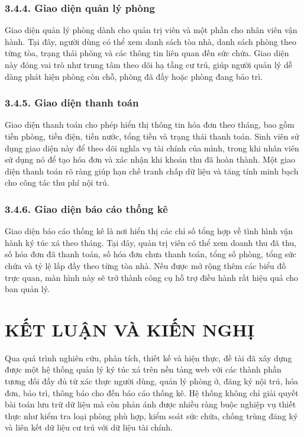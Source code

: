 \documentclass[12pt]{article}
\begin{document}
\subsubsection*{3.4.4. Giao diện quản lý phòng}

Giao diện quản lý phòng dành cho quản trị viên và một phần cho nhân viên vận hành. Tại đây, người dùng có thể xem danh sách tòa nhà, danh sách phòng theo từng tòa, trạng thái phòng và các thông tin liên quan đến sức chứa. Giao diện này đóng vai trò như trung tâm theo dõi hạ tầng cư trú, giúp người quản lý dễ dàng phát hiện phòng còn chỗ, phòng đã đầy hoặc phòng đang bảo trì.

\subsubsection*{3.4.5. Giao diện thanh toán}

Giao diện thanh toán cho phép hiển thị thông tin hóa đơn theo tháng, bao gồm tiền phòng, tiền điện, tiền nước, tổng tiền và trạng thái thanh toán. Sinh viên sử dụng giao diện này để theo dõi nghĩa vụ tài chính của mình, trong khi nhân viên sử dụng nó để tạo hóa đơn và xác nhận khi khoản thu đã hoàn thành. Một giao diện thanh toán rõ ràng giúp hạn chế tranh chấp dữ liệu và tăng tính minh bạch cho công tác thu phí nội trú.

\subsubsection*{3.4.6. Giao diện báo cáo thống kê}

Giao diện báo cáo thống kê là nơi hiển thị các chỉ số tổng hợp về tình hình vận hành ký túc xá theo tháng. Tại đây, quản trị viên có thể xem doanh thu đã thu, số hóa đơn đã thanh toán, số hóa đơn chưa thanh toán, tổng số phòng, tổng sức chứa và tỷ lệ lấp đầy theo từng tòa nhà. Nếu được mở rộng thêm các biểu đồ trực quan, màn hình này sẽ trở thành công cụ hỗ trợ điều hành rất hiệu quả cho ban quản lý.

\newpage
\section*{KẾT LUẬN VÀ KIẾN NGHỊ}

Qua quá trình nghiên cứu, phân tích, thiết kế và hiện thực, đề tài đã xây dựng được một hệ thống quản lý ký túc xá trên nền tảng web với các thành phần tương đối đầy đủ từ xác thực người dùng, quản lý phòng ở, đăng ký nội trú, hóa đơn, bảo trì, thông báo cho đến báo cáo thống kê. Hệ thống không chỉ giải quyết bài toán lưu trữ dữ liệu mà còn phản ánh được nhiều ràng buộc nghiệp vụ thiết thực như kiểm tra loại phòng phù hợp, kiểm soát sức chứa, chống trùng đăng ký và liên kết dữ liệu cư trú với dữ liệu tài chính.
\end{document}
